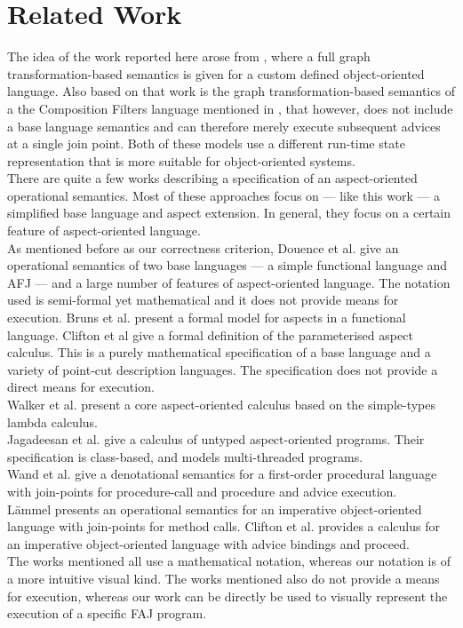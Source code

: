 \section{Related Work}\label{sec:relatedwork}

The idea of the work reported here arose from \cite{eemcs6140}, where a full graph transformation-based semantics is given for a custom defined object-oriented language. Also based on that work is the graph transformation-based semantics of a the Composition Filters language mentioned in \cite{StaijenRen2006}, that however, does not include a base language semantics and can therefore merely execute subsequent advices at a single join point. Both of these models use a different run-time state representation that is more suitable for object-oriented systems.\\
There are quite a few works describing a specification of an aspect-oriented operational semantics. Most of these approaches focus on --- like this work --- a simplified base language and aspect extension. In general, they focus on a certain feature of aspect-oriented language.\\
As mentioned before as our correctness criterion, Douence et al. \cite{DDFL-NoE06} give an operational semantics of two base languages --- a simple functional language and AFJ --- and a large number of features of aspect-oriented language. The notation used is semi-formal yet mathematical and it does not provide means for execution.
Bruns et al. \cite{Bruns04muabc:a} present a formal model for aspects in a functional language.
Clifton et al \cite{Clifton-Leavens-Wand03} give a formal definition of the parameterised aspect calculus. This is a purely mathematical specification of a base language and a variety of point-cut description languages. The specification does not provide a direct means for execution.\\
Walker et al. \cite{Walker03atheory} present a core aspect-oriented calculus based on the simple-types lambda calculus.\\
Jagadeesan et al. \cite{Jagadeesan03acalculus} give a calculus of untyped aspect-oriented programs. Their specification is class-based, and models multi-threaded programs.\\
Wand et al. \cite{Kiczales02asemantics} give a denotational semantics for a first-order procedural language with join-points for procedure-call and procedure and advice execution.\\
L\"ammel \cite{508392} presents an operational semantics for an imperative object-oriented language with join-points for method calls.
Clifton et al. \cite{Clifton-Leavens05,Clifton-Leavens05a} provides a calculus for an imperative object-oriented language with advice bindings and proceed.\\
The works mentioned all use a mathematical notation, whereas our notation is of a more intuitive visual kind. The works mentioned also do not provide a means for execution, whereas our work can be directly be used to visually represent the execution of a specific FAJ program.
